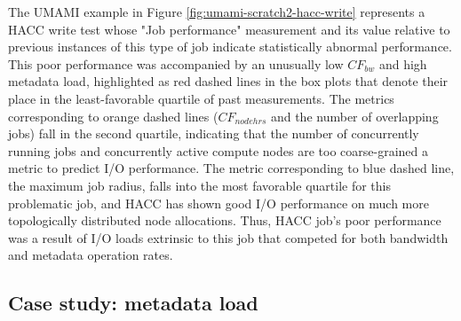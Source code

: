 The UMAMI example in Figure \ref{fig:umami-scratch2-hacc-write} represents a HACC write test whose "Job performance" measurement and its value relative to previous instances of this type of job indicate statistically abnormal performance.
This poor performance was accompanied by an unusually low $\mathit{CF}_{\mathit{bw}}$ and high metadata load, highlighted as red dashed lines in the box plots that denote their place in the least-favorable quartile of past measurements.
The metrics corresponding to orange dashed lines ($\mathit{CF}_{\mathit{nodehrs}}$ and the number of overlapping jobs) fall in the second quartile, indicating that the number of concurrently running jobs and concurrently active compute nodes are too coarse-grained a metric to predict I/O performance.
The metric corresponding to blue dashed line, the maximum job radius, falls into the most favorable quartile for this problematic job, and HACC has shown good I/O performance on much more topologically distributed node allocations.
Thus, HACC job's poor performance was a result of I/O loads extrinsic to this job that competed for both bandwidth and metadata operation rates.

\subsection{Case study: metadata load}

